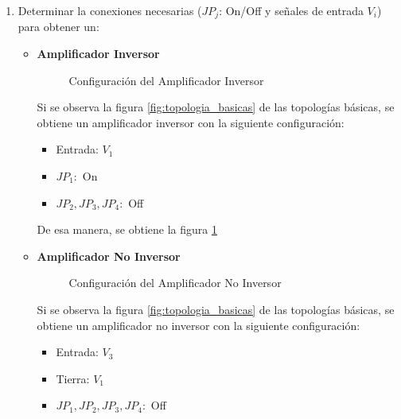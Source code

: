 \begin{enumerate}[label=\textbf{\arabic*.}, font=\bfseries]
    
    \item Determinar la conexiones necesarias ($JP_j$: On/Off y señales de entrada $V_i$) para obtener un:

    \begin{itemize}
        \item \textbf{Amplificador Inversor}
            \begin{figure}[H]
              \centering              
              
              \caption{Configuración del Amplificador Inversor}
              \label{fig:inversor}
            \end{figure}

        Si se observa la figura \ref{fig:topologia_basicas} de las topologías básicas, se obtiene un amplificador inversor con la siguiente configuración:

            \begin{itemize}
                \item  Entrada: $V_1$
                \item  $JP_1:$ On
                \item  $JP_2,JP_3,JP_4:$ Off
            \end{itemize}
        
        De esa manera, se obtiene la figura \ref{fig:inversor}
\newpage

        \item \textbf{Amplificador No Inversor}

            \begin{figure}[H]
              \centering              
              \caption{Configuración del Amplificador No Inversor}
              \label{fig:no_inversor}
            \end{figure}
            
            Si se observa la figura \ref{fig:topologia_basicas} de las topologías básicas, se obtiene un amplificador no inversor con la siguiente configuración:

            \begin{itemize}
                \item  Entrada: $V_3$
                \item  Tierra: $V_1$
                \item  $JP_1, JP_2,JP_3,JP_4:$ Off
            \end{itemize}
        

\end{itemize}
\end{enumerate}
